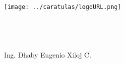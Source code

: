 % 
\begin{titlepage}
\vspace*{\fill}
\begin{center}
\texttt{[image: ../caratulas/logoURL.png]}~
\\[1cm]
\\
\\
\\[1cm]
\text{\large \nCurso} \\
Ing. Dhaby Eugenio Xiloj C.
\\[2cm]
\HBar \\[0.5cm]
\text{\LARGE\cTituloA}
\\[1cm]
\text{\LARGE\cTituloB} \\[0.5cm]
\HBar \\[3cm]

\cFecha
\end{center}
\vspace*{\fill}
\end{titlepage}